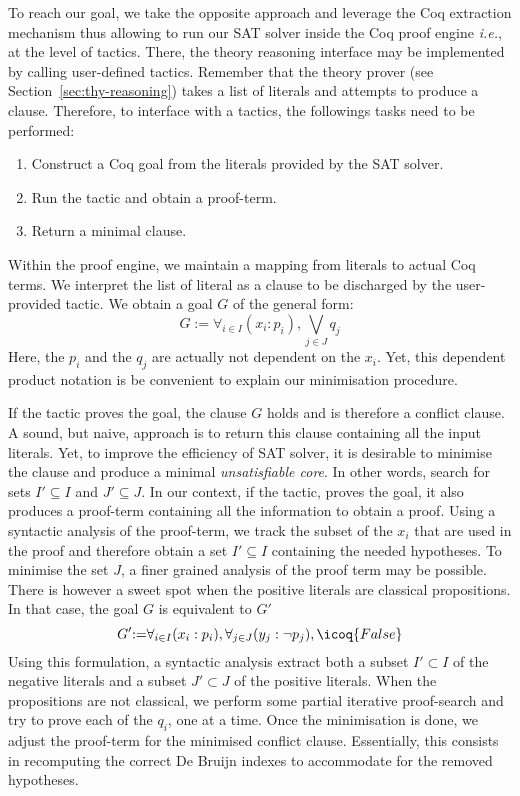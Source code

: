 \documentclass[a4paper,UKenglish,cleveref, autoref, thm-restate]{lipics-v2019}
\begin{document}
To reach our goal, we take the opposite approach and leverage the Coq
extraction mechanism thus allowing to run our SAT solver inside the
Coq proof engine \emph{i.e.}, at the level of tactics.
%
There, the theory reasoning interface may be implemented by calling
user-defined tactics.
%
Remember that the theory prover  (see Section~\ref{sec:thy-reasoning})
takes a list of literals and attempts to produce a clause.
Therefore, to interface with a tactics, the followings tasks need to be performed:
\begin{enumerate}
\item Construct a Coq goal from the literals provided by the SAT solver.
\item Run the tactic and obtain a proof-term.
\item Return a minimal clause.
\end{enumerate}
Within the proof engine, we maintain a mapping from literals to actual
Coq terms. We interpret the list of literal as a clause to be
discharged by the user-provided tactic. We obtain a goal $G$ of the general form:
\[
  G {:=} \forall_{i\in I} (x_i:p_i), \bigvee_{j\in J} q_j
\]
Here, the $p_i$ and the $q_j$ are actually not dependent on the
$x_i$. Yet, this dependent product notation is be convenient to
explain our minimisation procedure.

If the tactic proves the goal, the clause $G$ holds and is therefore a
conflict clause.  A sound, but naive, approach is to return this clause
containing all the input literals.
%
Yet, to improve the efficiency of SAT solver, it is desirable to
minimise the clause and produce a minimal \emph{unsatisfiable
  core}. In other words, search for sets $I' \subseteq I$ and $J' \subseteq J$.
%
In our context, if the tactic, proves the goal, it also produces a
proof-term containing all the information to obtain a proof.
%
Using a syntactic analysis of the proof-term, we track the subset of the $x_i$ that
are used in the proof and therefore obtain a set $I'\subseteq I$ containing the needed hypotheses.
%
To minimise the set $J$, a finer grained analysis of the proof term may be possible.
There is however a sweet spot when the positive literals are classical propositions.
In that case, the goal $G$ is equivalent to $G'$
\[
  G' {:=} \forall_{i\in I} (x_i:p_i), \forall_{j\in J} (y_j:\neg p_j), \icoq{False}
\]
Using this formulation, a syntactic analysis extract both a subset
$I' \subset I$ of the negative literals and a subset $J' \subset J$ of
the positive literals.  When the propositions are not classical, we
perform some partial iterative proof-search and try to prove each of
the $q_i$, one at a time.
%
Once the minimisation is done, we adjust the proof-term for the minimised
conflict clause. Essentially, this consists in recomputing the correct De Bruijn
indexes to accommodate for the removed hypotheses. 
\end{document}
